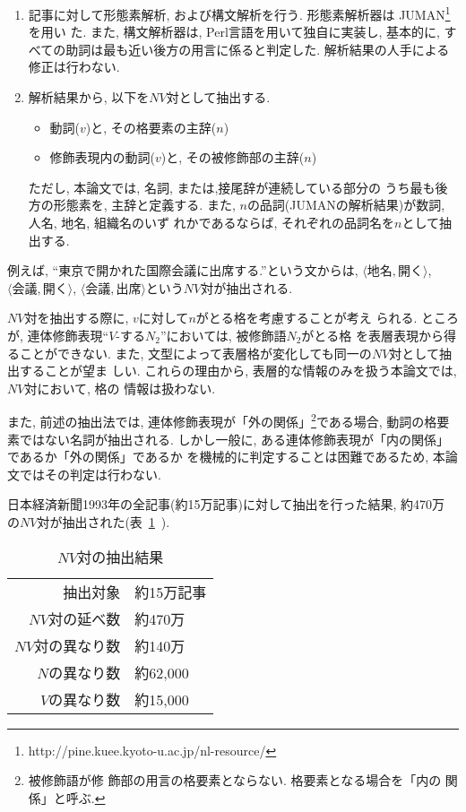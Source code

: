 \begin{enumerate}
\item 記事に対して形態素解析, および構文解析を行う. 形態素解析器は
      JUMAN\footnote{http://pine.kuee.kyoto-u.ac.jp/nl-resource/}を用い
      た. また, 構文解析器は, Perl言語を用いて独自に実装し, 基本的に, す
      べての助詞は最も近い後方の用言に係ると判定した.
      解析結果の人手による修正は行わない.
\item 解析結果から, 以下を$NV対$として抽出する. 
      \begin{itemize}
       \item 動詞($v$)と, その格要素の主辞($n$)
       \item 修飾表現内の動詞($v$)と, その被修飾部の主辞($n$)
      \end{itemize}
      ただし, 本論文では, 名詞, または,接尾辞が連続している部分の
      うち最も後方の形態素を, 主辞と定義する.
      また, $n$の品詞(JUMANの解析結果)が数詞, 人名, 地名, 組織名のいず
      れかであるならば, それぞれの品詞名を$n$として抽出する.
\end{enumerate}
例えば, ``東京で開かれた国際会議に出席する.''という文からは, 
$\langle 地名, 開く \rangle$, $\langle 会議, 開く\rangle$, 
$\langle 会議, 出席  \rangle$という$NV対$が抽出される. 

$NV対$を抽出する際に, $v$に対して$n$がとる格を考慮することが考え
られる.
ところが, 連体修飾表現``$V$-する$N_2$''においては, 被修飾語$N_2$がとる格
を表層表現から得ることができない.
また, 文型によって表層格が変化しても同一の$NV対$として抽出することが望ま
しい.
これらの理由から, 表層的な情報のみを扱う本論文では, $NV対$において, 格の
情報は扱わない.

また, 前述の抽出法では, 連体修飾表現が「外の関係」\footnote{被修飾語が修
飾部の用言の格要素とならない\cite{teramura75}. 格要素となる場合を「内の
関係」と呼ぶ.}である場合, 動詞の格要素ではない名詞が抽出される.
しかし一般に, ある連体修飾表現が「内の関係」であるか「外の関係」であるか 
を機械的に判定することは困難であるため, 本論文ではその判定は行わない.

日本経済新聞1993年の全記事(約15万記事)に対して抽出を行った結果, 約470万
の$NV対$が抽出された(表~\ref{chushutsukekka}~).

\begin{table}[hbt]
\caption{$NV対$の抽出結果}
\label{chushutsukekka}
\vspace{-4mm}
\begin{center}
\begin{tabular}{|rl|}
\hline
抽出対象 & 約15万記事\\
$NV対$の延べ数 & 約470万\\
$NV対$の異なり数 & 約140万\\
 $N$の異なり数 & 約62,000\\
 $V$の異なり数 & 約15,000\\
\hline
\end{tabular}
\end{center}
\end{table}

